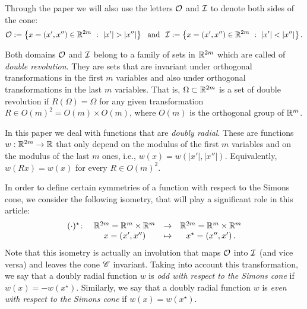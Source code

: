 Through the paper we will also use the letters $\mathcal{O}$ and $\mathcal{I}$ to denote both sides of the cone:
\begin{equation}
\label{Eq:DefOandI}
\mathcal{O}:= \left \{ x = (x', x'') \in \mathbb{R}^{2m} \ : \ |x'| > |x''| \right \} \ \textrm{ and } \
\mathcal{I}:= \left \{ x = (x', x'') \in \mathbb{R}^{2m} \ : \ |x'| < |x''| \right \}.
\end{equation}



Both domains $\mathcal{O}$ and $\mathcal{I}$ belong to a family of sets in $\mathbb{R}^{2m}$ which are called of \emph{double revolution}. They are sets that are invariant under orthogonal transformations in the first $m$ variables and also under orthogonal transformations in the last $m$ variables. That is, $\Omega\subset \mathbb{R}^{2m}$ is a set of double revolution if $R(\Omega) = \Omega$ for any given transformation $R\in O(m)^2 = O(m) \times O(m)$, where  $O(m)$ is the orthogonal group of $\mathbb{R}^m$.

In this paper we deal with functions that are \emph{doubly radial}. These are functions $w:\mathbb{R}^{2m}  \to \mathbb{R}$ that only depend on the modulus of the first $m$ variables and on the modulus of the last $m$ ones, i.e., $w(x) = w(|x'|,|x''|)$. Equivalently, $w(Rx) = w(x)$ for every $R \in O(m)^2$.

In order to define certain symmetries of a function with respect to the Simons cone, we consider the following isometry, that will play a significant role in this article:
\begin{equation}
\label{Eq:DefStar}
\begin{matrix}
(\cdot)^\star \colon & \mathbb{R}^{2m}= \mathbb{R}^{m}\times \mathbb{R}^{m}  &\to&  \mathbb{R}^{2m}= \mathbb{R}^{m}\times \mathbb{R}^{m}  \\
& x = (x',x'') &\mapsto & x^\star = (x'',x')\,.
\end{matrix}
\end{equation}
Note that this isometry is actually an involution that maps $\mathcal{O}$ into $\mathcal{I}$ (and vice versa) and leaves the cone $\mathscr{C}$ invariant. Taking into account this transformation, we say that a doubly radial function $w$ is \emph{odd with respect to the Simons cone} if $w(x) = -w(x^\star)$. Similarly, we say that a doubly radial function $w$ is \emph{even with respect to the Simons cone} if $w(x) = w(x^\star)$.

